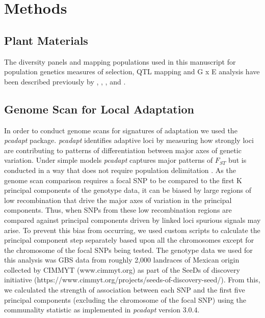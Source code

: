 \section{Methods}

\subsection{Plant Materials}
The diversity panels and mapping populations used in this manuscript for population genetics measures of selection, QTL mapping and G x E analysis have been described previously by \cite{Wang2020-mp}, \cite{Gates2019-xu}, \cite{Romero_Navarro2017-cn}, \cite{Janzen2021-lz} and \cite{Perez-Limon2022-lg}. 

\subsection{Genome Scan for Local Adaptation}
In order to conduct genome scans for signatures of adaptation we used the \textit{pcadapt} \cite{Luu2017-ws} package.
\textit{pcadapt} identifies adaptive loci by measuring how strongly loci are contributing to patterns of differentiation between major axes of genetic variation.
Under simple models \textit{pcadapt} captures major patterns of $F_{ST}$  but is conducted in a way that does not require population delimitation \cite{duforet2014genome}.
As the genome scan comparison requires a focal SNP to be compared to the first K principal components of the genotype data, it can be biased by large regions of low recombination that drive the major axes of variation in the principal components.
Thus, when SNPs from these low recombination regions are compared against principal components driven by linked loci spurious signals may arise.
To prevent this bias from occurring, we used custom scripts to calculate the principal component step separately based upon all the chromosomes except for the chromosome of the focal SNPs being tested.
The genotype data we used for this analysis was GBS data from roughly 2,000 landraces of Mexican origin collected by CIMMYT (www.cimmyt.org) as part of the SeeDs of discovery initiative (https://www.cimmyt.org/projects/seeds-of-discovery-seed/).
From this, we calculated the strength of association between each SNP and the first five principal components (excluding the chromosome of the focal SNP) using the communality statistic as implemented in \textit{pcadapt} version 3.0.4.


